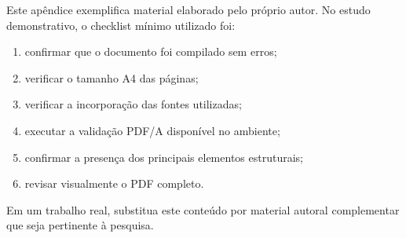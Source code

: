 \label{ap:validation-checklist}

Este apêndice exemplifica material elaborado pelo próprio autor. No estudo demonstrativo, o checklist mínimo utilizado foi:

\begin{enumerate}
  \item confirmar que o documento foi compilado sem erros;
  \item verificar o tamanho A4 das páginas;
  \item verificar a incorporação das fontes utilizadas;
  \item executar a validação PDF/A disponível no ambiente;
  \item confirmar a presença dos principais elementos estruturais;
  \item revisar visualmente o PDF completo.
\end{enumerate}

Em um trabalho real, substitua este conteúdo por material autoral complementar que seja pertinente à pesquisa.
